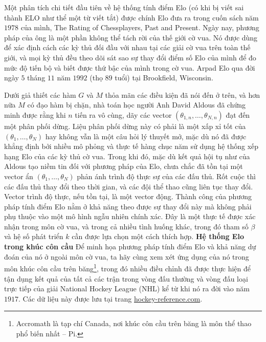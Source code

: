 \begin{tBox}
	\vskip 0.05cm
	Một phân tích chi tiết đầu tiên về hệ thống tính điểm Elo (có khi bị viết sai thành ELO như thể một từ viết tắt) được chính Elo đưa ra trong cuốn sách năm $1978$ của mình, The Rating of Chessplayers, Past and Present. Ngày nay, phương pháp của ông là một phần không thể tách rời của thế giới cờ vua. Nó được dùng để xác định cách các kỳ thủ đối đầu với nhau tại các giải cờ vua trên toàn thế giới, và mọi kỳ thủ đều theo dõi sát sao sự thay đổi điểm số Elo của mình để đo mức độ tiến bộ và biết được thứ bậc của mình trong cờ vua.
	\vskip 0.05cm
	Arpad Elo qua đời ngày $5$ tháng $11$ năm $1992$ (thọ $89$ tuổi) tại Brookfield, Wisconsin.
	\vspace*{-3pt}
\end{tBox}
\begin{multicols}{2}
	
	\vskip 0.05cm
	Dưới giả thiết các hàm $G$ và $M$ thỏa mãn các điều kiện đã nói đến ở trên, và hơn nữa $M$ có đạo hàm bị chặn, nhà toán học người Anh David Aldous đã chứng minh được rằng khi $n$ tiến ra vô cùng, dãy các vector $(\theta_{1, n}, \dots, \theta_{N, n})$ đạt đến một phân phối dừng. Liệu phân phối dừng này có phải là một xấp xỉ tốt của $(\theta_1, \dots, \theta_N)$ hay không vẫn là một câu hỏi lý thuyết mở, mặc dù nó đã được khẳng định bởi nhiều mô phỏng và thực tế hàng chục năm sử dụng hệ thống xếp hạng Elo của các kỳ thủ cờ vua.
	\vskip 0.05cm
	Trong khi đó, mặc dù kết quả hội tụ như của Aldous tạo niềm tin đối với phương pháp của Elo, chưa chắc đã tồn tại một vector ẩn $(\theta_1, \dots, \theta_N)$ phản ánh trình độ thực sự của các đấu thủ. Rốt cuộc thì các đấu thủ thay đổi theo thời gian, và các đội thể thao cũng liên tục thay đổi. Vector trình độ thực, nếu tồn tại, là một vector động.
	\vskip 0.05cm
	Thành công của phương pháp tính điểm Elo nằm ở khả năng theo được sự thay đổi này mà không phải phụ thuộc vào một mô hình ngẫu nhiên chính xác. Đây là một thực tế được xác nhận trong môn cờ vua, và trong cả nhiều tình huống khác, trong đó tham số $\beta$ và hệ số phát triển $k$ cần được lựa chọn một cách thích hợp.
	\vskip 0.05cm
	\textbf{\color{toanhocdoisong}Hệ thống Elo trong khúc côn cầu}
	\vskip 0.05cm
	Để minh họa phương pháp tính điểm Elo và khả năng dự đoán của nó ở ngoài môn cờ vua, ta hãy cùng xem xét ứng dụng của nó trong môn khúc côn cầu trên băng\footnote[4]{\color{toanhocdoisong}Accromath là tạp chí Canada, nơi khúc côn cầu trên băng là môn thể thao phổ biến nhất -- Pi.}, trong đó nhiều điều chỉnh đã được thực hiện để tận dụng kết quả của tất cả các trận trong vòng đấu thường và vòng đấu loại trực tiếp của giải National Hockey League (NHL) kể từ khi nó ra đời vào năm $1917$. Các dữ liệu này được lưu tại trang \url{hockey-reference.com}.

\end{multicols}
